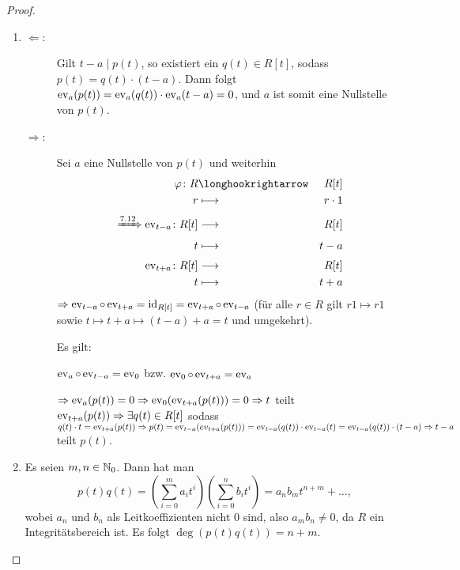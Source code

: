 \documentclass[12pt,a4paper]{scrartcl}
\begin{document}
\begin{proof}
	\leavevmode
	\begin{enumerate}
		\item \begin{description}
			\item[\glqq$\Leftarrow$\grqq:] Gilt $t-a \mid p(t)$, so existiert ein $q(t) \in R[t]$, sodass $p(t) = q(t)\cdot (t-a)$. Dann folgt $\operatorname{ev}_a (p(t)) = \operatorname{ev}_a(q(t))\cdot\operatorname{ev}_a(t-a) = 0$, und $a$ ist somit eine Nullstelle von $p(t)$.
			\item[\glqq$\Rightarrow$\grqq:] Sei $a$ eine Nullstelle von $p(t)$ und weiterhin
			\begin{eqnarray*}
				\phi\colon R&\longhookrightarrow & R[t]\\
				r & \longmapsto & r\cdot 1\\[1mm]
				\xRightarrow{7.12} \ev_{t-a} \colon R[t]& \longto & R[t]\\
				t&\longmapsto &t-a\\[1mm]
				\ev_{t+a}\colon R[t] & \longto & R[t]\\
				t & \longmapsto & t+a
			\end{eqnarray*}
			$\Rightarrow  \operatorname{ev}_{t-a}\circ \operatorname{ev}_{t+a} = \operatorname{id}_{R[t]} = \operatorname{ev}_{t+a}\circ \operatorname{ev}_{t-a}$
			(für alle $r\in R$ gilt $r1\mapsto r1$ sowie $t\mapsto t+a\mapsto (t-a)+a = t$ und umgekehrt).
			
			Es gilt:
			\begin{center}
			\end{center}
			$\operatorname{ev}_a \circ \operatorname{ev}_{t-a} = \operatorname{ev}_0$ bzw. $\operatorname{ev}_0\circ \operatorname{ev}_{t+a} = \operatorname{ev}_a$
			
			$\Rightarrow \operatorname{ev}_a(p(t)) = 0\Rightarrow \operatorname{ev}_0(\operatorname{ev}_{t+a}(p(t))) = 0\Rightarrow t$ teilt $\operatorname{ev}_{t+a}(p(t))\Rightarrow \exists q(t)\in R[t]$ sodass $q(t)\cdot t = \operatorname{ev}_{t+a}(p(t))\Rightarrow p(t) = \operatorname{ev}_{t-a}(ev_{t+a}(p(t))) = \operatorname{ev}_{t-a}(q(t))\cdot \operatorname{ev}_{t-a}(t) = \operatorname{ev}_{t-a}(q(t)) \cdot(t-a)\Rightarrow t-a$ teilt $p(t)$.
		\end{description}
		\item Es seien $m,n\in\mathbb N_0$. Dann hat man
		\[p(t)q(t) = \left(\sum_{i = 0}^{m}a_it^i\right)\left(\sum_{i = 0}^{n}b_it^i\right) = a_nb_mt^{n+m}+\dots,\] wobei $a_n$ und $b_n$ als Leitkoeffizienten nicht $0$ sind, also $a_mb_n\neq 0$, da $R$ ein Integritätsbereich ist. Es folgt $\deg(p(t)q(t)) = n+m$.
		

\end{enumerate}
\end{proof}
\end{document}
